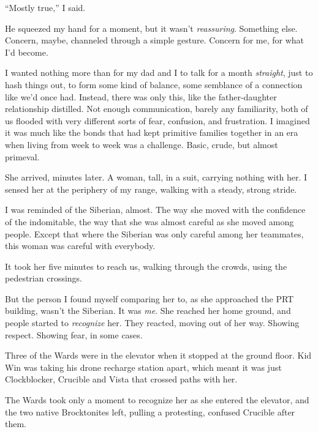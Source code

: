 ``Mostly true,'' I said.



He squeezed my hand for a moment, but it wasn't \emph{reassuring}.  Something else.  Concern, maybe, channeled through a simple gesture.  Concern for me, for what I'd become.



I wanted nothing more than for my dad and I to talk for a month \emph{straight}, just to hash things out, to form some kind of balance, some semblance of a connection like we'd once had.  Instead, there was only this, like the father-daughter relationship distilled.  Not enough communication, barely any familiarity, both of us flooded with very different sorts of fear, confusion, and frustration.  I imagined it was much like the bonds that had kept primitive families together in an era when living from week to week was a challenge.  Basic, crude, but almost primeval.



She arrived, minutes later.  A woman, tall, in a suit, carrying nothing with her.  I sensed her at the periphery of my range, walking with a steady, strong stride.



I was reminded of the Siberian, almost.  The way she moved with the confidence of the indomitable, the way that she was almost careful as she moved among people.  Except that where the Siberian was only careful among her teammates, this woman was careful with everybody.



It took her five minutes to reach us, walking through the crowds, using the pedestrian crossings.



But the person I found myself comparing her to, as she approached the PRT building, wasn't the Siberian.  It was \emph{me}.  She reached her home ground, and people started to \emph{recognize} her.  They reacted, moving out of her way.  Showing respect.  Showing fear, in some cases.



Three of the Wards were in the elevator when it stopped at the ground floor.  Kid Win was taking his drone recharge station apart, which meant it was just Clockblocker, Crucible and Vista that crossed paths with her.



The Wards took only a moment to recognize her as she entered the elevator, and the two native Brocktonites left, pulling a protesting, confused Crucible after them.



